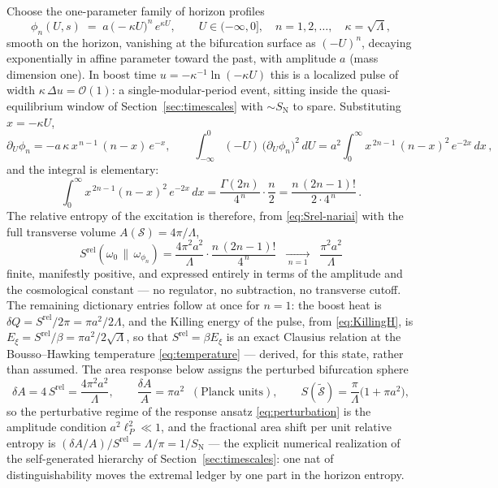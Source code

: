 \documentclass[11pt]{article}
\newcommand{\Srel}{S^{\mathrm{rel}}}
\begin{document}
Choose the one-parameter family of horizon profiles
\begin{equation}
\phi_n(U, s) \;=\; a\,\big(\!-\kappa U\big)^{n}\, e^{\kappa U},
\qquad U \in (-\infty, 0],
\quad n = 1, 2, \dots,
\quad \kappa = \sqrt{\Lambda},
\label{eq:example-profile}
\end{equation}
smooth on the horizon, vanishing at the bifurcation surface as $(-U)^n$, decaying exponentially in affine parameter toward the past, with amplitude $a$ (mass dimension one). In boost time $u = -\kappa^{-1}\ln(-\kappa U)$ this is a localized pulse of width $\kappa\,\Delta u = \mathcal{O}(1)$: a single-modular-period event, sitting inside the quasi-equilibrium window of Section~\ref{sec:timescales} with $\sim S_{\mathrm{N}}$ to spare. Substituting $x = -\kappa U$,
\begin{equation}
\partial_U \phi_n = -a\,\kappa\, x^{\,n-1}\,(n - x)\, e^{-x},
\qquad
\int_{-\infty}^{0} (-U)\,\big(\partial_U \phi_n\big)^2\, dU
= a^2 \int_0^\infty x^{\,2n-1}\, (n - x)^2\, e^{-2x}\, dx\,,
\end{equation}
and the integral is elementary:
\begin{equation}
\int_0^\infty x^{\,2n-1} (n-x)^2\, e^{-2x}\, dx
= \frac{\Gamma(2n)}{4^{\,n}}\cdot \frac{n}{2}
= \frac{n\,(2n-1)!}{2 \cdot 4^{\,n}}\,.
\end{equation}
The relative entropy of the excitation is therefore, from \eqref{eq:Srel-nariai} with the full transverse volume $A(\mathcal{S}) = 4\pi/\Lambda$,
\begin{equation}
\boxed{\;
\Srel(\omega_0\,\|\,\omega_{\phi_n})
= \frac{4\pi^2 a^2}{\Lambda}\cdot \frac{n\,(2n-1)!}{4^{\,n}}
\;\;\xrightarrow[\;n=1\;]{}\;\;
\frac{\pi^2 a^2}{\Lambda}
\;}
\label{eq:example-Srel}
\end{equation}
finite, manifestly positive, and expressed entirely in terms of the amplitude and the cosmological constant --- no regulator, no subtraction, no transverse cutoff. The remaining dictionary entries follow at once for $n = 1$: the boost heat is $\delta Q = \Srel/2\pi = \pi a^2 / 2\Lambda$, and the Killing energy of the pulse, from \eqref{eq:KillingH}, is $E_\xi = \Srel/\beta = \pi a^2/2\sqrt{\Lambda}$, so that $\Srel = \beta E_\xi$ is an exact Clausius relation at the Bousso--Hawking temperature \eqref{eq:temperature} --- derived, for this state, rather than assumed. The area response below assigns the perturbed bifurcation sphere
\begin{equation}
\delta A = 4\,\Srel = \frac{4\pi^2 a^2}{\Lambda},
\qquad
\frac{\delta A}{A} = \pi a^2
\;\;(\text{Planck units}),
\qquad
S(\tilde{\mathcal{S}}) = \frac{\pi}{\Lambda}\big(1 + \pi a^2\big),
\label{eq:example-area}
\end{equation}
so the perturbative regime of the response ansatz \eqref{eq:perturbation} is the amplitude condition $a^2 \ell_P^2 \ll 1$, and the fractional area shift per unit relative entropy is $(\delta A/A)/\Srel = \Lambda/\pi = 1/S_{\mathrm{N}}$ --- the explicit numerical realization of the self-generated hierarchy of Section~\ref{sec:timescales}: one nat of distinguishability moves the extremal ledger by one part in the horizon entropy.
\end{document}
